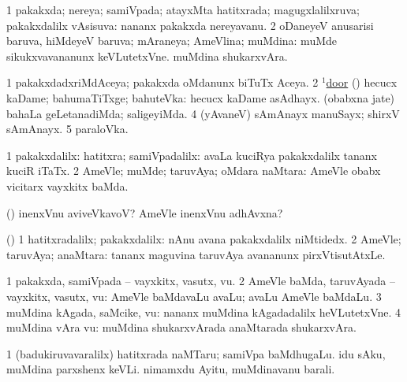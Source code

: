 \bentry
{}
\gl{\gu}
\bmng
\bnum
\num{1} pakakxda; nereya; samiVpada; atayxMta hatitxrada; magugxlalilxruva; pakakxdalilx vAsisuva:  nananx pakakxda nereyavanu. 
\num{2} oDaneyeV anusarisi baruva, hiMdeyeV baruva; mAraneya; AmeVlina; muMdina:  muMde sikukxvavananunx keVLutetxVne.  muMdina shukarxvAra. 
\enum
\emng

\noindent
\gl{\pagu}
\bmng
\bnum
\num{1}  pakakxdadxriMdAceya; pakakxda oMdanunx biTuTx Aceya. 
\num{2}  \hyperref{kandict_d.pdf}{D}{door(1) nuga(10)}{$^1$door}  
  
\banum
{} (\rUpa) hecucx kaDame; bahumaTiTxge; bahuteVka:  hecucx kaDame asAdhayx. 
 (obabxna jate) bahaLa geLetanadiMda; saligeyiMda. 
\eanum
\numie
\num{4} (yAvaneV) sAmAnayx manuSayx; shirxV sAmAnayx. 
\num{5}  paraloVka. 
\enum
\emng
\eentry

\bentry
{}
\gl{\kirxvi}
\bmng
\bnum
\num{1} pakakxdalilx: hatitxra; samiVpadalilx:  avaLa kuciRya pakakxdalilx tananx kuciR iTaTx. 
\num{2} AmeVle; muMde; taruvAya; oMdara naMtara:  AmeVle obabx vicitarx vayxkitx baMda. 
\enum
\emng

\noindent
\gl{\pagu}
\bmng
{}(\rUpa) inenxVnu aviveVkavoV? AmeVle inenxVnu adhAvxna? 
\emng
\eentry

\bentry
{}
\gl{\upa}
\bmng
(\pArxparx) 
\bnum
\num{1} hatitxradalilx; pakakxdalilx:  nAnu avana pakakxdalilx niMtidedx. 
\num{2} AmeVle; taruvAya; anaMtara:  tananx maguvina taruvAya avananunx pirxVtisutAtxLe. 
\enum
\emng
\eentry

\bentry
{}
\gl{\nA}
\bmng
\bnum
\num{1} pakakxda, samiVpada -- vayxkitx, vasutx, \mo vu. 
\num{2} AmeVle baMda, taruvAyada -- vayxkitx, vasutx, \mo vu:  AmeVle baMdavaLu avaLu; avaLu AmeVle baMdaLu. 
\num{3} muMdina kAgada, saMcike, \mo vu:  nananx muMdina kAgadadalilx heVLutetxVne. 
\num{4} muMdina vAra \mo vu:  muMdina shukarxvArada anaMtarada shukarxvAra. 
\enum
\emng

\noindent
\gl{\pagu}
\bmng
{} 
\bnum
\num{1} (badukiruvavaralilx) hatitxrada naMTaru; samiVpa baMdhugaLu. 
  
\banum
{} idu sAku, muMdina parxshenx keVLi. 
 nimamxdu Ayitu, muMdinavanu barali. 
\eanum
\numie
\enum
\emng
\eentry


